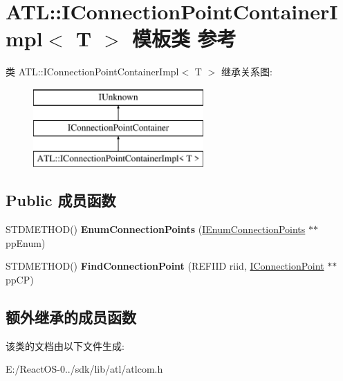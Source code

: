 \hypertarget{class_a_t_l_1_1_i_connection_point_container_impl}{}\section{A\+TL\+:\+:I\+Connection\+Point\+Container\+Impl$<$ T $>$ 模板类 参考}
\label{class_a_t_l_1_1_i_connection_point_container_impl}
类 A\+TL\+:\+:I\+Connection\+Point\+Container\+Impl$<$ T $>$ 继承关系图\+:\begin{figure}[H]
\begin{center}
\leavevmode
\includegraphics[height=3.000000cm]{class_a_t_l_1_1_i_connection_point_container_impl}
\end{center}
\end{figure}
\subsection*{Public 成员函数}
\begin{DoxyCompactItemize}
\item 
\mbox{\label{class_a_t_l_1_1_i_connection_point_container_impl_a6db1b58a92df7ba824ef8f59fddd32bc}} 
S\+T\+D\+M\+E\+T\+H\+OD() {\bfseries Enum\+Connection\+Points} (\hyperlink{interface_i_enum_connection_points}{I\+Enum\+Connection\+Points} $\ast$$\ast$pp\+Enum)
\item 
\mbox{\label{class_a_t_l_1_1_i_connection_point_container_impl_acc088a1f620801cb013550198927e88a}} 
S\+T\+D\+M\+E\+T\+H\+OD() {\bfseries Find\+Connection\+Point} (R\+E\+F\+I\+ID riid, \hyperlink{interface_i_connection_point}{I\+Connection\+Point} $\ast$$\ast$pp\+CP)
\end{DoxyCompactItemize}
\subsection*{额外继承的成员函数}


该类的文档由以下文件生成\+:\begin{DoxyCompactItemize}
\item 
E\+:/\+React\+O\+S-\/0../sdk/lib/atl/atlcom.\+h\end{DoxyCompactItemize}
